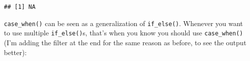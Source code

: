 \documentclass[]{gitbook}
\newenvironment{Shaded}{\begin{snugshade}}{\end{snugshade}}
\newcommand{\DataTypeTok}[1]{\textcolor[rgb]{0.13,0.29,0.53}{#1}}
\newcommand{\DecValTok}[1]{\textcolor[rgb]{0.00,0.00,0.81}{#1}}
\newcommand{\KeywordTok}[1]{\textcolor[rgb]{0.13,0.29,0.53}{\textbf{#1}}}
\newcommand{\NormalTok}[1]{#1}
\newcommand{\OperatorTok}[1]{\textcolor[rgb]{0.81,0.36,0.00}{\textbf{#1}}}
\newcommand{\StringTok}[1]{\textcolor[rgb]{0.31,0.60,0.02}{#1}}
\begin{document}
\begin{verbatim}
## [1] NA
\end{verbatim}

\texttt{case\_when()} can be seen as a generalization of \texttt{if\_else()}. Whenever you want to use multiple
\texttt{if\_else()}s, that's when you know you should use \texttt{case\_when()} (I'm adding the filter at the end
for the same reason as before, to see the output better):

\begin{Shaded}
\end{Shaded}
\end{document}
